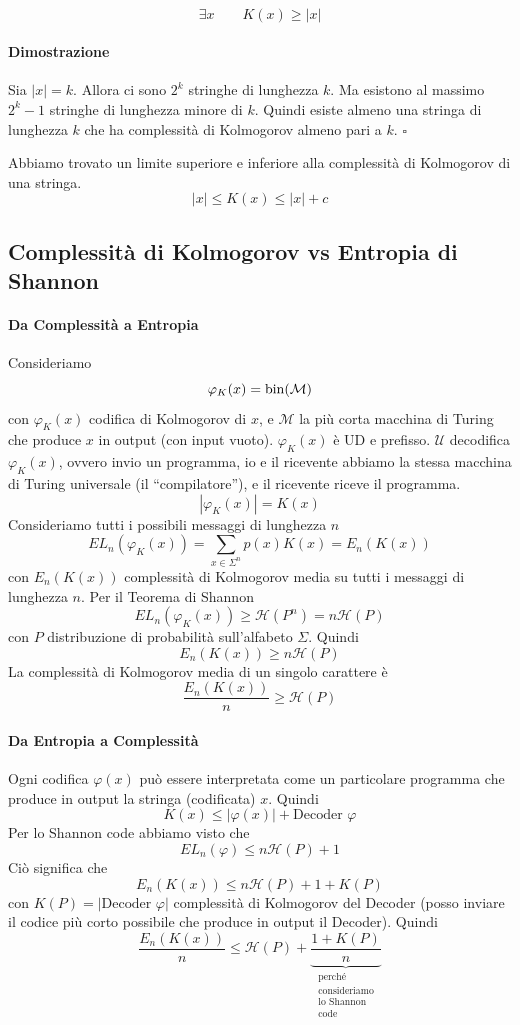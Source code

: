 \begin{theorem}~
    $$
        \exists x \qquad K(x) \geq |x|
    $$
\end{theorem}
\paragraph{Dimostrazione} Sia $|x|=k$. Allora ci sono $2^k$ stringhe di lunghezza $k$. Ma esistono al massimo $2^k-1$ stringhe di lunghezza minore di $k$. Quindi esiste almeno una stringa di lunghezza $k$ che ha complessità di Kolmogorov almeno pari a $k$. \hfill $\square$\bigskip

Abbiamo trovato un limite superiore e inferiore alla complessità di Kolmogorov di una stringa. 
$$
    |x| \leq K(x) \leq |x| + c
$$

\subsection{Complessità di Kolmogorov vs Entropia di Shannon} 
\paragraph{Da Complessità a Entropia} Consideriamo 
$$
    \varphi_K(x) = \operatorname*{bin}(\mathcal{M})
$$
con $\varphi_K(x)$ codifica di Kolmogorov di $x$, e $\mathcal{M}$ la più corta macchina di Turing che produce $x$ in output (con input vuoto). $\varphi_K(x)$ è UD e prefisso. $\mathcal{U}$ decodifica $\varphi_K(x)$, ovvero invio un programma, io e il ricevente abbiamo la stessa macchina di Turing universale (il ``compilatore''), e il ricevente riceve il programma.
$$
    |\varphi_K(x)| = K(x)
$$
Consideriamo tutti i possibili messaggi di lunghezza $n$
$$
    EL_n(\varphi_K(x)) = \sum_{x\in\Sigma^n} p(x)K(x) = E_n(K(x))
$$
con $E_n(K(x))$ complessità di Kolmogorov media su tutti i messaggi di lunghezza $n$. Per il Teorema di Shannon
$$
    EL_n(\varphi_K(x)) \geq \mathcal{H}(P^n) = n\mathcal{H}(P)
$$
con $P$ distribuzione di probabilità sull'alfabeto $\Sigma$. Quindi
$$
    E_n(K(x)) \geq n\mathcal{H}(P)
$$
La complessità di Kolmogorov media di un singolo carattere è 
$$
    \frac{E_n(K(x))}{n} \geq \mathcal{H}(P)
$$

\paragraph{Da Entropia a Complessità} Ogni codifica $\varphi(x)$ può essere interpretata come un particolare programma che produce in output la stringa (codificata) $x$. Quindi 
$$
    K(x) \leq |\varphi(x)| + \text{Decoder }\varphi
$$
Per lo Shannon code abbiamo visto che
$$
    EL_n(\varphi) \leq n\mathcal{H}(P) + 1
$$
Ciò significa che 
$$
    E_n(K(x)) \leq n\mathcal{H}(P) + 1 + K(P)
$$
con $K(P)=|\text{Decoder }\varphi|$ complessità di Kolmogorov del Decoder (posso inviare il codice più corto possibile che produce in output il Decoder). Quindi
$$
    \frac{E_n(K(x))}{n} \leq \mathcal{H}(P) + \underbrace{\frac{1+K(P)}{n}}_{\substack{\text{perché}\\\text{consideriamo}\\\text{lo Shannon}\\\text{code}}}
$$
